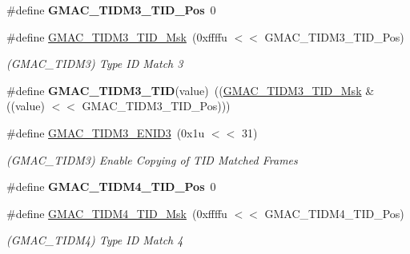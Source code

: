 \begin{DoxyCompactItemize}
\mbox{\label{group__SAME70__GMAC_ga39ca0cd230d31204823c933ee830a5bb}} 
\#define {\bfseries G\+M\+A\+C\+\_\+\+T\+I\+D\+M3\+\_\+\+T\+I\+D\+\_\+\+Pos}~0
\item 
\mbox{\label{group__SAME70__GMAC_gab03a9cab55ab449133b8c58951306344}} 
\#define \mbox{\hyperlink{group__SAME70__GMAC_gab03a9cab55ab449133b8c58951306344}{G\+M\+A\+C\+\_\+\+T\+I\+D\+M3\+\_\+\+T\+I\+D\+\_\+\+Msk}}~(0xffffu $<$$<$ G\+M\+A\+C\+\_\+\+T\+I\+D\+M3\+\_\+\+T\+I\+D\+\_\+\+Pos)
\begin{DoxyCompactList}\small\item\em (G\+M\+A\+C\+\_\+\+T\+I\+D\+M3) Type ID Match 3 \end{DoxyCompactList}\item 
\mbox{\label{group__SAME70__GMAC_gacf2fc9977445f17d965f30a1667e4ac8}} 
\#define {\bfseries G\+M\+A\+C\+\_\+\+T\+I\+D\+M3\+\_\+\+T\+ID}(value)~((\mbox{\hyperlink{group__SAMV71__GMAC_gab03a9cab55ab449133b8c58951306344}{G\+M\+A\+C\+\_\+\+T\+I\+D\+M3\+\_\+\+T\+I\+D\+\_\+\+Msk}} \& ((value) $<$$<$ G\+M\+A\+C\+\_\+\+T\+I\+D\+M3\+\_\+\+T\+I\+D\+\_\+\+Pos)))
\item 
\mbox{\label{group__SAME70__GMAC_ga168f56266b2b810449f46f3ea2b97901}} 
\#define \mbox{\hyperlink{group__SAME70__GMAC_ga168f56266b2b810449f46f3ea2b97901}{G\+M\+A\+C\+\_\+\+T\+I\+D\+M3\+\_\+\+E\+N\+I\+D3}}~(0x1u $<$$<$ 31)
\begin{DoxyCompactList}\small\item\em (G\+M\+A\+C\+\_\+\+T\+I\+D\+M3) Enable Copying of T\+ID Matched Frames \end{DoxyCompactList}\item 
\mbox{\label{group__SAME70__GMAC_ga0f0b2807b2e2d4f0b28e44e04eb50e62}} 
\#define {\bfseries G\+M\+A\+C\+\_\+\+T\+I\+D\+M4\+\_\+\+T\+I\+D\+\_\+\+Pos}~0
\item 
\mbox{\label{group__SAME70__GMAC_ga8ff11c8fe9e79c07cb9169549b3fcd62}} 
\#define \mbox{\hyperlink{group__SAME70__GMAC_ga8ff11c8fe9e79c07cb9169549b3fcd62}{G\+M\+A\+C\+\_\+\+T\+I\+D\+M4\+\_\+\+T\+I\+D\+\_\+\+Msk}}~(0xffffu $<$$<$ G\+M\+A\+C\+\_\+\+T\+I\+D\+M4\+\_\+\+T\+I\+D\+\_\+\+Pos)
\begin{DoxyCompactList}\small\item\em (G\+M\+A\+C\+\_\+\+T\+I\+D\+M4) Type ID Match 4 \end{DoxyCompactList}\item 

\end{DoxyCompactItemize}
